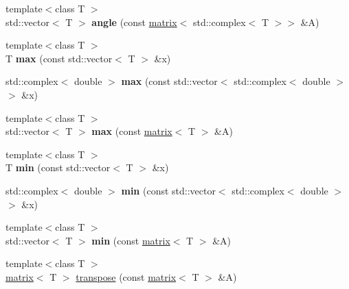 \begin{DoxyCompactItemize}
\item 
\hypertarget{namespacekeycpp_af0c9c769d613f7526406ecf3b3351d89}{{\footnotesize template$<$class T $>$ }\\std\-::vector$<$ T $>$ {\bfseries angle} (const \hyperlink{classkeycpp_1_1matrix}{matrix}$<$ std\-::complex$<$ T $>$$>$ \&A)}\label{namespacekeycpp_af0c9c769d613f7526406ecf3b3351d89}

\item 
\hypertarget{namespacekeycpp_a646c5e616337a8174bd39ce729e53612}{{\footnotesize template$<$class T $>$ }\\T {\bfseries max} (const std\-::vector$<$ T $>$ \&x)}\label{namespacekeycpp_a646c5e616337a8174bd39ce729e53612}

\item 
\hypertarget{namespacekeycpp_a35292f7ead7b19a2fc098f50f0147ce6}{std\-::complex$<$ double $>$ {\bfseries max} (const std\-::vector$<$ std\-::complex$<$ double $>$ $>$ \&x)}\label{namespacekeycpp_a35292f7ead7b19a2fc098f50f0147ce6}

\item 
\hypertarget{namespacekeycpp_af7ff5485352bd4412d18050843809d42}{{\footnotesize template$<$class T $>$ }\\std\-::vector$<$ T $>$ {\bfseries max} (const \hyperlink{classkeycpp_1_1matrix}{matrix}$<$ T $>$ \&A)}\label{namespacekeycpp_af7ff5485352bd4412d18050843809d42}

\item 
\hypertarget{namespacekeycpp_a28171fa81d0f537dd058e63164410b43}{{\footnotesize template$<$class T $>$ }\\T {\bfseries min} (const std\-::vector$<$ T $>$ \&x)}\label{namespacekeycpp_a28171fa81d0f537dd058e63164410b43}

\item 
\hypertarget{namespacekeycpp_aa0241416e190842fd0c352a6c94c57c3}{std\-::complex$<$ double $>$ {\bfseries min} (const std\-::vector$<$ std\-::complex$<$ double $>$ $>$ \&x)}\label{namespacekeycpp_aa0241416e190842fd0c352a6c94c57c3}

\item 
\hypertarget{namespacekeycpp_a33adfcd8368c2f96891ca3e27fd8affe}{{\footnotesize template$<$class T $>$ }\\std\-::vector$<$ T $>$ {\bfseries min} (const \hyperlink{classkeycpp_1_1matrix}{matrix}$<$ T $>$ \&A)}\label{namespacekeycpp_a33adfcd8368c2f96891ca3e27fd8affe}

\item 
\hypertarget{namespacekeycpp_a7fd5ce0385e9cc7bed5b44ed8475e8aa}{{\footnotesize template$<$class T $>$ }\\\hyperlink{classkeycpp_1_1matrix}{matrix}$<$ T $>$ \hyperlink{namespacekeycpp_a7fd5ce0385e9cc7bed5b44ed8475e8aa}{transpose} (const \hyperlink{classkeycpp_1_1matrix}{matrix}$<$ T $>$ \&A)}\label{namespacekeycpp_a7fd5ce0385e9cc7bed5b44ed8475e8aa}


\end{DoxyCompactItemize}
